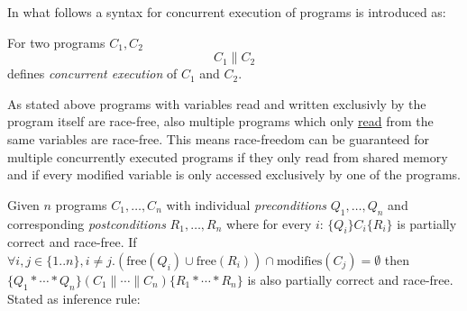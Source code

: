 	In what follows a syntax for concurrent execution of programs is introduced as:
	\begin{mydef}
		For two programs $C_1,C_2$
		$$C_1\parallel C_2$$
		defines \emph{concurrent execution} of $C_1$ and $C_2$.
	\end{mydef}

	As stated above programs with variables read and written exclusivly by
	the program itself are race-free, also multiple programs which only
	\underline{read} from the same variables are race-free. This means
	race-freedom can be guaranteed for multiple concurrently executed programs
	if they only read from shared memory and if every modified variable is only
	accessed exclusively by one of the programs.

	\begin{mydef}
	Given $n$ programs $C_1,\dots,C_n$ with individual
	\emph{preconditions} $Q_1,\dots,Q_n$ and corresponding \emph{postconditions} $R_1,\dots,R_n$ where for
	every $i$: $\{Q_i\}C_i\{R_i\}$ is partially correct and race-free. If
	$\forall i,j \in \{1..n\}, i \neq j.(\text{free}(Q_i)\cup\text{free}(R_i))
	\cap \text{modifies}(C_j)  = \emptyset$ then
	$\{Q_1\ast\cdots\ast Q_n\}(C_1\parallel \cdots\parallel C_n)\{R_1\ast\cdots\ast R_n\}$
	is also partially correct and race-free. Stated as inference rule:
	\begin{prooftree}
	\end{prooftree}
	\end{mydef}
